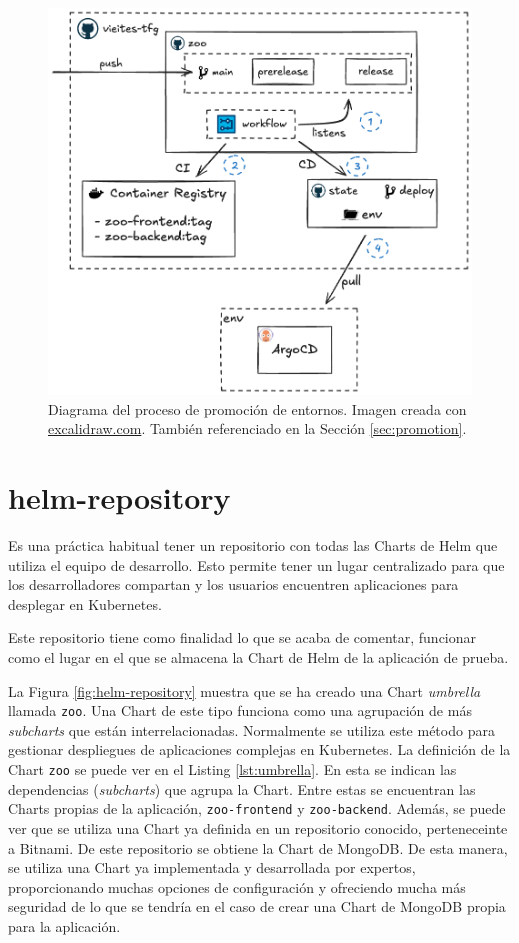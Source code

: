\begin{figure}[h]
  \centerline{\includegraphics[width=13cm]{figuras/promotion}}
  \caption{Diagrama del proceso de promoción de entornos. Imagen creada con \href{https://excalidraw.com}{excalidraw.com}. También referenciado en la Sección \ref{sec:promotion}.}
  \label{fig:promotion}
\end{figure}


\section{helm-repository}
\label{subsec:helm}

Es una práctica habitual tener un repositorio con todas las Charts de Helm que utiliza el equipo de desarrollo. Esto permite tener un lugar centralizado para que los desarrolladores compartan y los usuarios encuentren aplicaciones para desplegar en Kubernetes.

Este repositorio tiene como finalidad lo que se acaba de comentar, funcionar como el lugar en el que se almacena la Chart de Helm de la aplicación de prueba.

La Figura \ref{fig:helm-repository} muestra que se ha creado una Chart \textit{umbrella} llamada \texttt{zoo}. Una Chart de este tipo funciona como una agrupación de más \textit{subcharts} que están interrelacionadas. Normalmente se utiliza este método para gestionar despliegues de aplicaciones complejas en Kubernetes.
La definición de la Chart \texttt{zoo} se puede ver en el Listing \ref{lst:umbrella}. En esta se indican las dependencias (\textit{subcharts}) que agrupa la Chart. Entre estas se encuentran las Charts propias de la aplicación, \texttt{zoo-frontend} y \texttt{zoo-backend}. Además, se puede ver que se utiliza una Chart ya definida en un repositorio conocido, perteneceinte a Bitnami\cite{bitnami}. De este repositorio se obtiene la Chart de MongoDB. De esta manera, se utiliza una Chart ya implementada y desarrollada por expertos, proporcionando muchas opciones de configuración y ofreciendo mucha más seguridad de lo que se tendría en el caso de crear una Chart de MongoDB propia para la aplicación.


